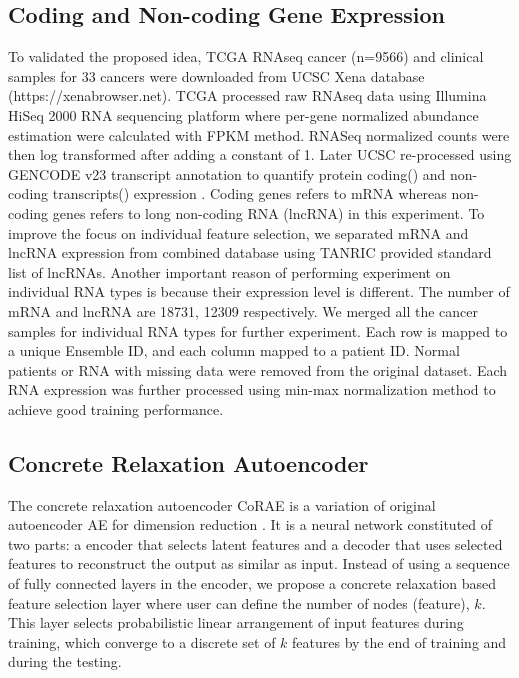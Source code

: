 \documentclass{bioinfo}
\begin{document}
\subsection{Coding and Non-coding Gene Expression}
To validated the proposed idea, TCGA RNAseq cancer (n=9566) and clinical samples for 33 cancers were downloaded from UCSC Xena database (https://xenabrowser.net). TCGA processed raw RNAseq data using Illumina HiSeq 2000 RNA sequencing platform where per-gene normalized abundance estimation were calculated with FPKM method. RNASeq normalized counts were then log transformed after adding a constant of 1. Later UCSC re-processed using GENCODE v23 transcript annotation to quantify protein coding() and non-coding transcripts() expression \cite{harrow2006gencode}. Coding genes refers to mRNA whereas non-coding genes refers to long non-coding RNA (lncRNA) in this experiment. To improve the focus on individual feature selection, we separated mRNA and lncRNA expression from combined database using TANRIC \cite{li2015tanric} provided standard list of lncRNAs. Another important reason of performing experiment on individual RNA types is because their expression level is different. The number of mRNA and lncRNA are 18731, 12309 respectively. We merged all the cancer samples for individual RNA types for further experiment. Each row is mapped to a unique Ensemble ID, and each column mapped to a patient ID. Normal patients or RNA with missing data were removed from the original dataset. Each RNA expression was further processed using min-max normalization method to achieve good training performance. 

\subsection{Concrete Relaxation Autoencoder} \label{CoRAE}
The concrete relaxation autoencoder CoRAE is a variation of original autoencoder AE for dimension reduction \cite{hinton2006reducing}. It is a neural network constituted of two parts: a encoder that selects latent features and a decoder that uses selected features to reconstruct the output as similar as input. Instead of using a sequence of fully connected layers in the encoder,  we propose a concrete relaxation based feature selection layer where user can define the number of nodes (feature), $k$. This layer selects probabilistic linear arrangement of input features during training, which converge to a discrete set of $k$ features by the end of training and during the testing. 
\end{document}
